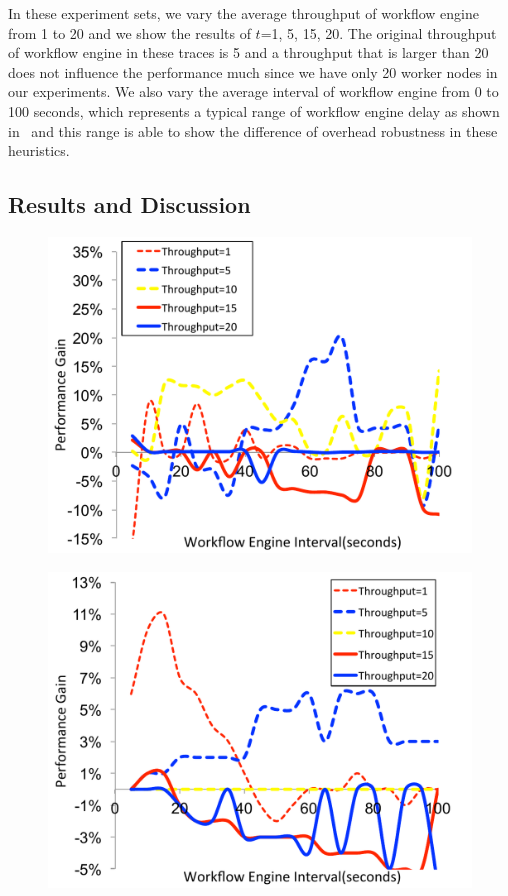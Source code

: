 In these experiment sets, we vary the average throughput of workflow engine from 1 to 20 and we show the results of $t$=1, 5, 15, 20. The original throughput of workflow engine in these traces is 5 and a throughput that is larger than 20 does not influence the performance much since we have only 20 worker nodes in our experiments. We also vary the average interval of workflow engine from 0 to 100 seconds, which represents a typical range of workflow engine delay as shown in~\cite{Chen2011} and this range is able to show the difference of overhead robustness in these heuristics. 

\subsection{Results and Discussion}

\begin{figure}[!htb]
\centering
 \includegraphics[width=0.9\linewidth]{figures/sensitivity/MAX-MIN-Broadband.pdf}
  \label{fig:sensitivity_MAX-MIN-Broadband}
\end{figure}

\begin{figure}[!htb]
\centering
 \includegraphics[width=0.9\linewidth]{figures/sensitivity/MAX-MIN-CyberShake.pdf}
  \label{fig:sensitivity_MAX-MIN-CyberShake}
\end{figure}

